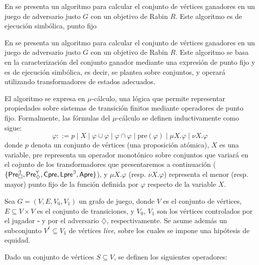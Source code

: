 En \cite{Banerjee} se presenta un algoritmo para calcular el conjunto de
vértices ganadores en un juego de adversario justo $G$ con un objetivo de Rabin
$R$. Este algoritmo es de ejecución simbólica, punto fijo

En \cite{Banerjee} se presenta un algoritmo para calcular el conjunto de
vértices ganadores en un juego de adversario justo \( G \) con un objetivo de
Rabin \( R \). Este algoritmo se basa en la caracterización del conjunto
ganador mediante una expresión de punto fijo y es de ejecución simbólica, es
decir, se plantea sobre conjuntos, y operará utilizando transformadores de
estados adecuados.

El algoritmo se expresa en $\mu$-cálculo, una lógica que permite representar
propiedades sobre sistemas de transición finitos mediante operadores de punto
fijo. Formalmente, las fórmulas del $\mu$-cálculo se definen inductivamente
como sigue:
\[
	\varphi ::= p \mid X \mid \varphi \cup \varphi \mid \varphi \cap \varphi \mid \text{pre}(\varphi) \mid \mu X.\varphi \mid \nu X.\varphi
\]
donde \( p \) denota un conjunto de vértices (una proposición atómica), \( X \)
es una variable, \(\text{pre}\) representa un operador monotónico sobre
conjuntos que variará en el cojunto de los transformadores que presentaremos a
continuación ($\{\textsf{Pre}_\square^\exists, \textsf{Pre}_\diamondsuit^\forall, \textsf{Cpre}, \textsf{Lpre}^\exists,
	\textsf{Apre}\}$), y \( \mu X.\varphi \) (resp. \( \nu X.\varphi \)) representa el
menor (resp. mayor) punto fijo de la función definida por \( \varphi \)
respecto de la variable \( X \).

Sea \( G = (V, E, V_0, V_1) \) un grafo de juego, donde \( V \) es el conjunto
de vértices, \( E \subseteq V \times V \) es el conjunto de transiciones, y \(
V_0 \), \( V_1 \) son los vértices controlados por el jugador \( \square \) y
por el adversario \( \diamondsuit \), respectivamente. Se asume además un
subconjunto \( V^\ell \subseteq V_1 \) de vértices \emph{live}, sobre los
cuales se impone una hipótesis de equidad.

Dado un conjunto de vértices \( S \subseteq V \), se definen los siguientes
operadores: %


